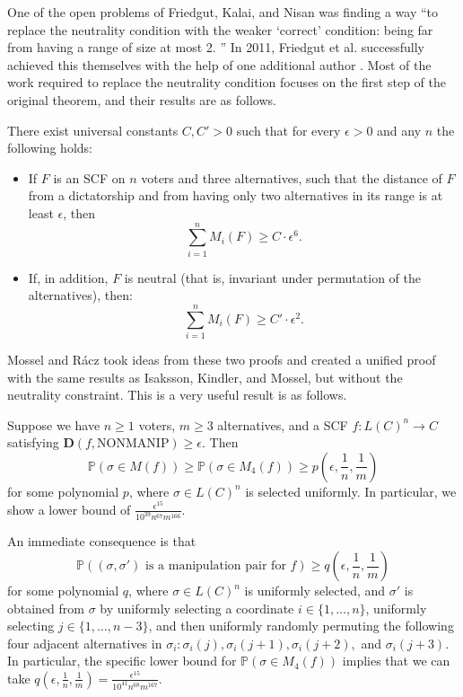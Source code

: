 	One of the open problems of Friedgut, Kalai, and Nisan was finding a way ``to replace the neutrality condition with the weaker `correct' condition: being far from having a range of size at most 2. \cite{friedgut2008elections}'' In 2011, Friedgut et al. successfully achieved this themselves with the help of one additional author \cite{friedgut2011quantitative}. Most of the work required to replace the neutrality condition focuses on the first step of the original theorem, and their results are as follows.
	\begin{theorem}
		There exist universal constants $C, C' > 0$ such that for every $\epsilon > 0$ and any $n$ the following holds:
		\begin{itemize}
			\item If $F$ is an SCF on $n$ voters and three alternatives, such that the distance of $F$ from a dictatorship and from having only two alternatives in its range is at least $\epsilon$, then
			\[
				\sum_{i=1}^n M_i(F) \ge C \cdot \epsilon^6.
			\]
			\item If, in addition, $F$ is neutral (that is, invariant under permutation of the alternatives), then:
			\[
				\sum_{i=1}^n M_i(F) \ge C' \cdot \epsilon^2.
			\]
		\end{itemize}
	\end{theorem}

	Mossel and R\'{a}cz \cite{mossel2011quantitative} took ideas from these two proofs and created a unified proof with the same results as Isaksson, Kindler, and Mossel, but without the neutrality constraint. This is a very useful result is as follows.
	\begin{theorem}
		Suppose we have $n \ge 1$ voters, $m \ge 3$ alternatives, and a SCF $f : L(C)^n \rightarrow C$ satisfying $\mathbf{D}(f, \mathrm{NONMANIP}) \ge \epsilon$. Then
		\[
			\mathbb{P}(\sigma \in M(f)) \ge \mathbb{P}(\sigma \in M_4(f)) \ge p \left( \epsilon, \frac{1}{n}, \frac{1}{m} \right)
		\]
		for some polynomial $p$, where $\sigma \in L(C)^n$ is selected uniformly. In particular, we show a lower bound of $\frac{\epsilon^{15}}{10^{39} n^{67} m^{166}}$.

		An immediate consequence is that
		\[
			\mathbb{P}((\sigma, \sigma') \text{ is a manipulation pair for } f) \ge q \left( \epsilon, \frac{1}{n}, \frac{1}{m} \right)
		\]
		for some polynomial $q$, where $\sigma \in L(C)^n$ is uniformly selected, and $\sigma'$ is obtained from $\sigma$ by uniformly selecting a coordinate $i \in \{ 1, \ldots, n \}$, uniformly selecting $j \in \{ 1, \ldots, n-3 \}$, and then uniformly randomly permuting the following four adjacent alternatives in $\sigma_i: \sigma_i(j), \sigma_i(j+1), \sigma_i(j+2),$ and $\sigma_i(j+3)$. In particular, the specific lower bound for $\mathbb{P}(\sigma \in M_4(f))$ implies that we can take $q \left( \epsilon, \frac{1}{n}, \frac{1}{m} \right) = \frac{\epsilon^{15}}{10^{41} n^{68} m^{167}}$.
	\end{theorem}

